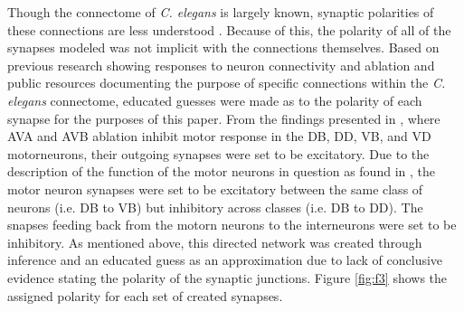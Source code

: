 \documentclass[11pt]{article} %
\begin{document}
Though the connectome of \emph{C. elegans} is largely known, synaptic polarities of these connections are less understood \cite{Rakowski2013}. Because of this, the polarity of all of the synapses modeled was not implicit with the connections themselves. Based on previous research showing responses to neuron connectivity and ablation \cite{Kunert2014, Chalfie1985, White1986, Chen2006} and public resources \cite{Altun2003, Oshio2003} documenting the purpose of specific connections within the \emph{C. elegans} connectome, educated guesses were made as to the polarity of each synapse for the purposes of this paper. From the findings presented in \cite{Chalfie1985}, where AVA and AVB ablation inhibit motor response in the DB, DD, VB, and VD motorneurons, their outgoing synapses were set to be excitatory. Due to the description of the function of the motor neurons in question as found in \cite{Altun2003}, the motor neuron synapses were set to be excitatory between the same class of neurons (i.e. DB to VB) but inhibitory across classes (i.e. DB to DD). The snapses feeding back from the motorn neurons to the interneurons were set to be inhibitory. As mentioned above, this directed network was created through inference and an educated guess as an approximation due to lack of conclusive evidence stating the polarity of the synaptic junctions. Figure \ref{fig:f3} shows the assigned polarity for each set of created synapses. 
\end{document}
